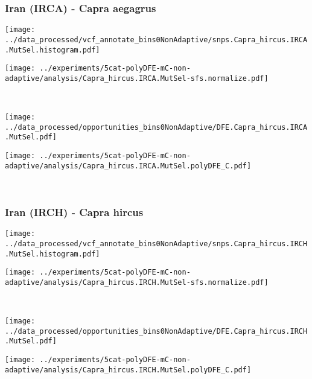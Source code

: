 \subsubsection{Iran (IRCA) - Capra aegagrus}

\begin{minipage}{0.49\linewidth}
    \texttt{[image: ../data\_processed/vcf\_annotate\_bins0NonAdaptive/snps.Capra\_hircus.IRCA.MutSel.histogram.pdf]}
\end{minipage}
\begin{minipage}{0.49\linewidth}
    \texttt{[image: ../experiments/5cat-polyDFE-mC-non-adaptive/analysis/Capra\_hircus.IRCA.MutSel-sfs.normalize.pdf]}
\end{minipage}
\\
\begin{minipage}{0.49\linewidth}
    \texttt{[image: ../data\_processed/opportunities\_bins0NonAdaptive/DFE.Capra\_hircus.IRCA.MutSel.pdf]}
\end{minipage}
\begin{minipage}{0.49\linewidth}
    \texttt{[image: ../experiments/5cat-polyDFE-mC-non-adaptive/analysis/Capra\_hircus.IRCA.MutSel.polyDFE\_C.pdf]}
\end{minipage}
\\

\subsubsection{Iran (IRCH) - Capra hircus}

\begin{minipage}{0.49\linewidth}
    \texttt{[image: ../data\_processed/vcf\_annotate\_bins0NonAdaptive/snps.Capra\_hircus.IRCH.MutSel.histogram.pdf]}
\end{minipage}
\begin{minipage}{0.49\linewidth}
    \texttt{[image: ../experiments/5cat-polyDFE-mC-non-adaptive/analysis/Capra\_hircus.IRCH.MutSel-sfs.normalize.pdf]}
\end{minipage}
\\
\begin{minipage}{0.49\linewidth}
    \texttt{[image: ../data\_processed/opportunities\_bins0NonAdaptive/DFE.Capra\_hircus.IRCH.MutSel.pdf]}
\end{minipage}
\begin{minipage}{0.49\linewidth}
    \texttt{[image: ../experiments/5cat-polyDFE-mC-non-adaptive/analysis/Capra\_hircus.IRCH.MutSel.polyDFE\_C.pdf]}
\end{minipage}
\\

